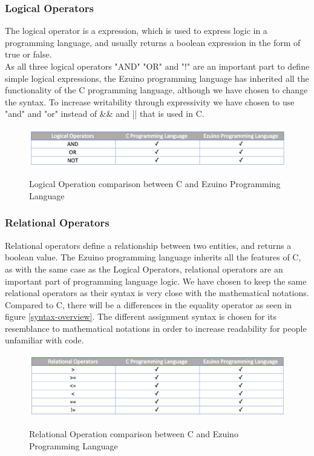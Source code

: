 \subsubsection*{Logical Operators}
The logical operator is a expression, which is used to express logic in a programming language, and usually returns a boolean expression in the form of true or false. \\
As all three logical operators "AND" "OR" and "!" are an important part to define simple logical expressions, the Ezuino programming language has inherited all the functionality of the C programming language, although we have chosen to change the syntax. To increase writability through expressivity we have chosen to use "and" and "or" instead of \&\& and || that is used in C.\\
\begin{figure}[H]
\centering
\caption{Logical Operation comparison between C and Ezuino Programming Language}
\includegraphics[scale=0.60]{figures/language_features/langf03.png}
\label{lf03}
\end{figure}
\subsubsection*{Relational Operators}
Relational operators define a relationship between two entities, and returns a boolean value.  
The Ezuino programming language inherits all the features of C, as with the same case as the Logical Operators, relational operators are an important part of programming language logic. We have chosen to keep the same relational operators as their syntax is very close with the mathematical notations. Compared to C, there will be a differences in the equality operator as seen in figure \ref{syntax-overview}. The different assignment syntax is chosen for its resemblance to mathematical notations in order to increase readability for people unfamiliar with code. 
\begin{figure}[H]
\centering
\caption{Relational Operation comparison between C and Ezuino Programming Language}
\includegraphics[scale=0.60]{figures/language_features/langf04.png}
\label{lf04}
\end{figure}

